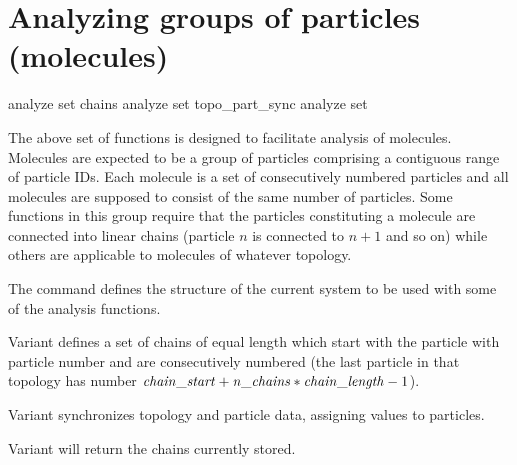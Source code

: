 
\section{Analyzing groups of particles (molecules)}
\label{analyze:set}

\begin{essyntax}
   analyze set chains 
   analyze set topo\_part\_sync
   analyze set
\end{essyntax}

The above set of functions is designed to facilitate analysis of
molecules. Molecules are expected to be a group of particles
comprising a contiguous range of particle IDs. Each molecule is a set
of consecutively numbered particles and all molecules are supposed to
consist of the same number of particles.  Some functions in this group
require that the particles constituting a molecule are connected into
linear chains (particle $n$ is connected to $n+1$ and so on) while
others are applicable to molecules of whatever topology.

The  command defines the structure of the current
system to be used with some of the analysis functions.

Variant  defines a set of  chains of equal
length  which start with the particle with particle
number  and are consecutively numbered (\ie the last
particle in that topology has number $\mathrm{\mathit{chain\_start}} +
\mathrm{\mathit{n\_chains}}*\mathrm{\mathit{chain\_length}} - 1$). 

Variant  synchronizes topology and particle data, assigning
 values to particles.

Variant  will return the chains currently stored.



